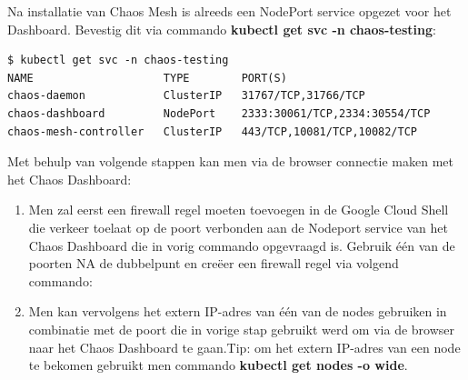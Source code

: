 Na installatie van Chaos Mesh is alreeds een NodePort service opgezet voor het Dashboard. Bevestig dit via commando {\bf kubectl get svc -n chaos-testing}: 
\begin{lstlisting}
$ kubectl get svc -n chaos-testing
NAME                    TYPE        PORT(S)                                
chaos-daemon            ClusterIP   31767/TCP,31766/TCP                     
chaos-dashboard         NodePort    2333:30061/TCP,2334:30554/TCP          
chaos-mesh-controller   ClusterIP   443/TCP,10081/TCP,10082/TCP

\end{lstlisting}

Met behulp van volgende stappen kan men via de browser connectie maken met het Chaos Dashboard:
\begin{enumerate}
    \item Men zal eerst een firewall regel moeten toevoegen in de Google Cloud Shell die verkeer toelaat op de poort verbonden aan de Nodeport service van het Chaos Dashboard die in vorig commando opgevraagd is. Gebruik één van de poorten NA de dubbelpunt en creëer een firewall regel via volgend commando:
    \item Men kan vervolgens het extern IP-adres van één van de nodes gebruiken in combinatie met de poort die in vorige stap gebruikt werd om via de browser naar het Chaos Dashboard te gaan.\newline Tip: om het extern IP-adres van een node te bekomen gebruikt men commando {\bf kubectl get nodes -o wide}.  
\end{enumerate}

